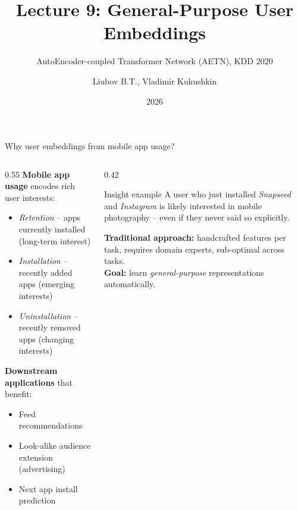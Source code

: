 \documentclass[aspectratio=169,t]{beamer}
\title{Lecture 9: General-Purpose User Embeddings}
\subtitle{AutoEncoder-coupled Transformer Network (AETN), KDD 2020}
\author{Liubov B.T., Vladimir Kukushkin}
\institute{Constructor University}
\date{2026}
\begin{document}
\maketitle

\begin{frame}{Why user embeddings from mobile app usage?}
  \begin{columns}[T]
    \begin{column}{0.55\textwidth}
      \textbf{Mobile app usage} encodes rich user interests:
      \begin{itemize}
        \item \emph{Retention} -- apps currently installed (long-term interest)
        \item \emph{Installation} -- recently added apps (emerging interests)
        \item \emph{Uninstallation} -- recently removed apps (changing interests)
      \end{itemize}
      \vspace{0.4cm}
      \textbf{Downstream applications} that benefit:
      \begin{itemize}
        \item Feed recommendations
        \item Look-alike audience extension (advertising)
        \item Next app install prediction
      \end{itemize}
    \end{column}
    \begin{column}{0.42\textwidth}
      \vspace{0.2cm}
      \begin{block}{Insight example}
        A user who just installed \emph{Snapseed} and \emph{Instagram} is likely interested in mobile photography -- even if they never said so explicitly.
      \end{block}
      \vspace{0.3cm}
      \textbf{Traditional approach:} handcrafted features per task, requires domain experts, sub-optimal across tasks.\\[0.2cm]
      \textbf{Goal:} learn \emph{general-purpose} representations automatically.
    \end{column}
  \end{columns}
\end{frame}
\end{document}
